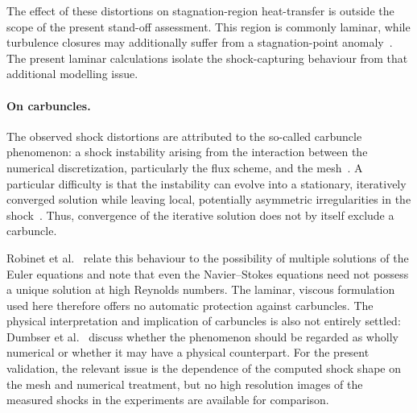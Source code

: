 The effect of these distortions on stagnation-region heat-transfer is outside
the scope of the present stand-off assessment. This region is commonly laminar,
while turbulence closures may additionally suffer from a stagnation-point
anomaly~\citep{durbin1996k}. The present laminar calculations isolate the
shock-capturing behaviour from that additional modelling issue.

\clearpage
\paragraph{On carbuncles.}
\label{para:carbuncles}

The observed shock distortions are attributed to the so-called carbuncle
phenomenon: a shock instability arising from the interaction between the
numerical discretization, particularly the flux scheme, and the
mesh~\citep{Robinet2000ShockInstabilityCarbuncle,Dumbser2004CarbuncleStability}.
A particular difficulty is that the instability can evolve into a stationary,
iteratively converged solution while leaving local, potentially asymmetric
irregularities in the shock~\citep[p.~238]{Robinet2000ShockInstabilityCarbuncle}.
Thus, convergence of the iterative solution does not by itself exclude a
carbuncle.
\par\medskip

Robinet et al.~\citep[p.~261]{Robinet2000ShockInstabilityCarbuncle} relate this
behaviour to the possibility of multiple solutions of the Euler equations and
note that even the Navier--Stokes equations need not possess a unique solution
at high Reynolds numbers. The laminar,
viscous formulation used here therefore offers no automatic protection against
carbuncles. The physical interpretation and implication of carbuncles is also not entirely settled: Dumbser et al.~\citep[p.~648]{Dumbser2004CarbuncleStability} discuss whether the
phenomenon should be regarded as wholly numerical or whether it may have a
physical counterpart. For the present validation, the relevant issue is the
dependence of the computed shock shape on the mesh and numerical treatment, but no high resolution images of the measured shocks in the experiments are available for comparison.
\par\medskip

